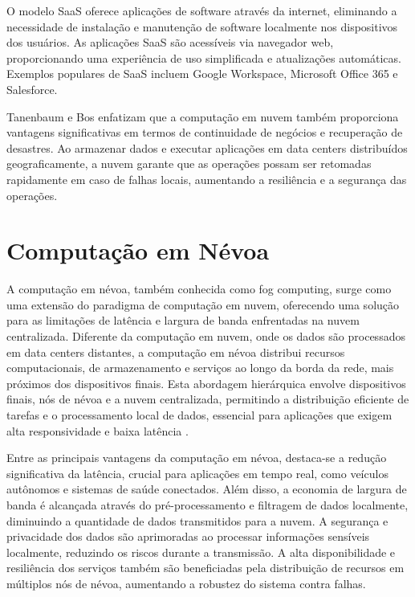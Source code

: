 O modelo SaaS oferece aplicações de software através da internet, eliminando a necessidade de instalação e manutenção de software localmente nos dispositivos dos usuários. As aplicações SaaS são acessíveis via navegador web, proporcionando uma experiência de uso simplificada e atualizações automáticas. Exemplos populares de SaaS incluem Google Workspace, Microsoft Office 365 e Salesforce.

Tanenbaum e Bos enfatizam que a computação em nuvem também proporciona vantagens significativas em termos de continuidade de negócios e recuperação de desastres. Ao armazenar dados e executar aplicações em data centers distribuídos geograficamente, a nuvem garante que as operações possam ser retomadas rapidamente em caso de falhas locais, aumentando a resiliência e a segurança das operações.

\section{Computação em Névoa}

A computação em névoa, também conhecida como fog computing, surge como uma extensão do paradigma de computação em nuvem, oferecendo uma solução para as limitações de latência e largura de banda enfrentadas na nuvem centralizada. Diferente da computação em nuvem, onde os dados são processados em data centers distantes, a computação em névoa distribui recursos computacionais, de armazenamento e serviços ao longo da borda da rede, mais próximos dos dispositivos finais. Esta abordagem hierárquica envolve dispositivos finais, nós de névoa e a nuvem centralizada, permitindo a distribuição eficiente de tarefas e o processamento local de dados, essencial para aplicações que exigem alta responsividade e baixa latência \cite{rahmani2018}.

Entre as principais vantagens da computação em névoa, destaca-se a redução significativa da latência, crucial para aplicações em tempo real, como veículos autônomos e sistemas de saúde conectados. Além disso, a economia de largura de banda é alcançada através do pré-processamento e filtragem de dados localmente, diminuindo a quantidade de dados transmitidos para a nuvem. A segurança e privacidade dos dados são aprimoradas ao processar informações sensíveis localmente, reduzindo os riscos durante a transmissão. A alta disponibilidade e resiliência dos serviços também são beneficiadas pela distribuição de recursos em múltiplos nós de névoa, aumentando a robustez do sistema contra falhas.

